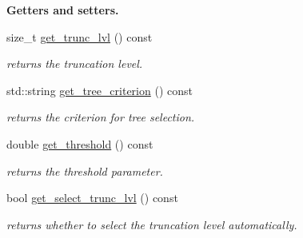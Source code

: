 \begin{Indent}\textbf{ Getters and setters.}\par
\begin{DoxyCompactItemize}
\item 
\mbox{\label{classvinecopulib_1_1_fit_controls_vinecop_ace8965fe7c115ac40611f0e46f441a96}} 
size\+\_\+t \hyperlink{classvinecopulib_1_1_fit_controls_vinecop_ace8965fe7c115ac40611f0e46f441a96}{get\+\_\+trunc\+\_\+lvl} () const
\begin{DoxyCompactList}\small\item\em returns the truncation level. \end{DoxyCompactList}\item 
\mbox{\label{classvinecopulib_1_1_fit_controls_vinecop_aaf3f0b43e26f0877e5030afd90e35d1e}} 
std\+::string \hyperlink{classvinecopulib_1_1_fit_controls_vinecop_aaf3f0b43e26f0877e5030afd90e35d1e}{get\+\_\+tree\+\_\+criterion} () const
\begin{DoxyCompactList}\small\item\em returns the criterion for tree selection. \end{DoxyCompactList}\item 
\mbox{\label{classvinecopulib_1_1_fit_controls_vinecop_a6c428e61c86c371cee6f98367ff35796}} 
double \hyperlink{classvinecopulib_1_1_fit_controls_vinecop_a6c428e61c86c371cee6f98367ff35796}{get\+\_\+threshold} () const
\begin{DoxyCompactList}\small\item\em returns the threshold parameter. \end{DoxyCompactList}\item 
\mbox{\label{classvinecopulib_1_1_fit_controls_vinecop_a18c66b8801249218f07c3897064f0b5d}} 
bool \hyperlink{classvinecopulib_1_1_fit_controls_vinecop_a18c66b8801249218f07c3897064f0b5d}{get\+\_\+select\+\_\+trunc\+\_\+lvl} () const
\begin{DoxyCompactList}\small\item\em returns whether to select the truncation level automatically. \end{DoxyCompactList}\item 
\mbox{\label{classvinecopulib_1_1_fit_controls_vinecop_ac2c2854d43466a4d3733c24f282a2e79}} 

\end{DoxyCompactItemize}
\end{Indent}
